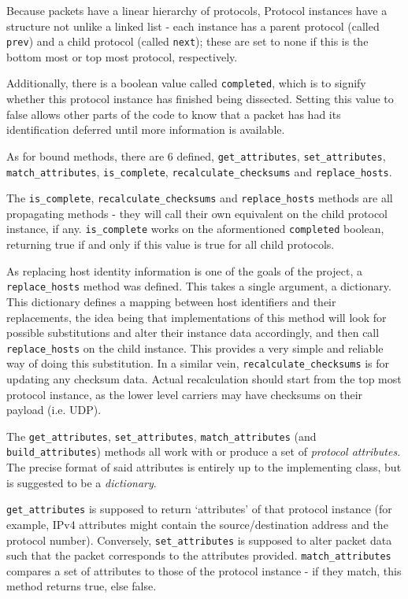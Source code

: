 \documentclass[10pt,a4paper,notitlepage]{report}
\begin{document}
Because packets have a linear hierarchy of protocols, Protocol instances have a structure not unlike a linked list - each instance has a parent protocol (called \texttt{prev}) and a child protocol (called \texttt{next}); these are set to none if this is the bottom most or top most protocol, respectively.

Additionally, there is a boolean value called \texttt{completed}, which is to signify whether this protocol instance has finished being dissected. Setting this value to false allows other parts of the code to know that a packet has had its identification deferred until more information is available.

As for bound methods, there are 6 defined, \texttt{get_attributes}, \texttt{set_attributes}, \texttt{match_attributes}, \texttt{is_complete}, \texttt{recalculate_checksums} and \texttt{replace_hosts}.

The \texttt{is_complete}, \texttt{recalculate_checksums} and \texttt{replace_hosts} methods are all propagating methods - they will call their own equivalent on the child protocol instance, if any. \texttt{is_complete} works on the aformentioned \texttt{completed} boolean, returning true if and only if this value is true for all child protocols.

As replacing host identity information is one of the goals of the project, a \texttt{replace_hosts} method was defined. This takes a single argument, a dictionary. This dictionary defines a mapping between host identifiers and their replacements, the idea being that implementations of this method will look for possible substitutions and alter their instance data accordingly, and then call \texttt{replace_hosts} on the child instance. This provides a very simple and reliable way of doing this substitution. In a similar vein, \texttt{recalculate_checksums} is for updating any checksum data. Actual recalculation should start from the top most protocol instance, as the lower level carriers may have checksums on their payload (i.e. UDP).

The \texttt{get_attributes}, \texttt{set_attributes}, \texttt{match_attributes} (and \texttt{build_attributes})  methods all work with or produce  a set of \emph{protocol attributes}. The precise format of said attributes is entirely up to the implementing class, but is suggested to be a \emph{dictionary}.

\texttt{get_attributes} is supposed to return `attributes' of that protocol instance (for example, IPv4 attributes might contain the source/destination address and the protocol number). Conversely, \texttt{set_attributes} is supposed to alter packet data such that the packet corresponds to the attributes provided. \texttt{match_attributes} compares a set of attributes to those of the protocol instance - if they match, this method returns true, else false.
\end{document}
